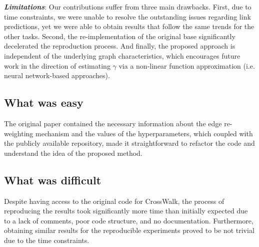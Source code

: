 \textit{\textbf{Limitations}}: Our contributions suffer from three main drawbacks. First, due to time constraints, we were unable to resolve the outstanding issues regarding link predictions, yet we were able to obtain results that follow the same trends for the other tasks. Second, the re-implementation of the original base significantly decelerated the reproduction process. And finally, the proposed approach is independent of the underlying graph characteristics, which encourages future work in the direction of estimating $\gamma$ via a non-linear function approximation (i.e. neural network-based approaches). 






\subsection{What was easy}
 The original paper contained the necessary information about the edge re-weighting mechanism and the values of the hyperparameters, which coupled with the publicly available repository, made it straightforward to refactor the code and understand the idea of the proposed method. \\

\subsection{What was difficult}
Despite having access to the original code for CrossWalk, the process of reproducing the results took significantly more time than initially expected due to a lack of comments, poor code structure, and no documentation. Furthermore, obtaining similar results for the reproducible experiments proved to be not trivial due to the time constraints.

